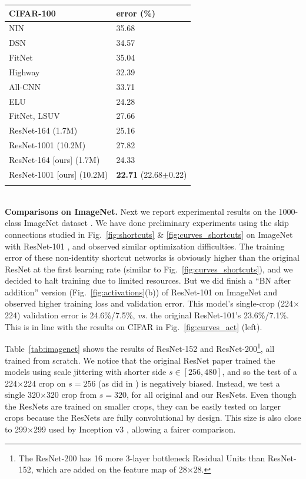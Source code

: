 \documentclass[runningheads]{llncs}
\def\vs{\emph{vs. }}
\begin{document}
\begin{table}[t]
{\fontsize{8pt}{1em}\selectfont
\begin{tabular}{l|l}
\hline
  \textbf{CIFAR-100}   & error (\%) \\
\hline
NIN \cite{Lin2014a} & 35.68 \\ %
DSN \cite{Lee2015} & 34.57 \\ %
FitNet \cite{Romero2015} & 35.04 \\ %
Highway \cite{Srivastava2015a} & 32.39 \\ %
All-CNN \cite{Springenberg2014} & 33.71 \\ %
ELU \cite{Clevert2016} & 24.28 \\ %
FitNet, LSUV \cite{Mishkin2016} & 27.66 \\ %
\hline
ResNet-164 \cite{He2016} (1.7M) & 25.16 \\
ResNet-1001 \cite{He2016} (10.2M) & 27.82 \\
\hline
ResNet-164 [ours] (1.7M) & 24.33 \\
ResNet-1001 [ours] (10.2M) & \textbf{22.71} {\tiny (22.68$\pm$0.22)} \\
\hline
\multicolumn{2}{c}{} \\
\end{tabular}
}
\end{table}

{\small ~\\}
\noindent\textbf{Comparisons on ImageNet.}
Next we report experimental results on the 1000-class ImageNet dataset \cite{Russakovsky2015}. We have done preliminary experiments using the skip connections studied in Fig.~\ref{fig:shortcuts} \& \ref{fig:curves_shortcuts}  on ImageNet with ResNet-101 \cite{He2016}, and observed similar optimization difficulties. The training error of these non-identity shortcut networks is obviously higher than the original ResNet at the first learning rate (similar to Fig.~\ref{fig:curves_shortcuts}), and we decided to halt training due to limited resources. But we did finish a ``BN after addition'' version (Fig.~\ref{fig:activations}(b)) of ResNet-101 on ImageNet and observed higher training loss and validation error. This model's single-crop (224$\times$224) validation error is 24.6\%/7.5\%, \vs the original ResNet-101's 23.6\%/7.1\%. This is in line with the results on CIFAR in Fig.~\ref{fig:curves_act} (left).

Table~\ref{tab:imagenet} shows the results of ResNet-152 \cite{He2016} and ResNet-200\footnote{The ResNet-200 has 16 more 3-layer bottleneck Residual Units than ResNet-152, which are added on the feature map of 28$\times$28.}, all trained from scratch. We notice that the original ResNet paper \cite{He2016} trained the models using scale jittering with shorter side $s\in[256, 480]$, and so the test of a 224$\times$224 crop on $s=256$ (as did in \cite{He2016}) is negatively biased. Instead, we test a single 320$\times$320 crop from $s=320$, for all original and our ResNets.
Even though the ResNets are trained on smaller crops, they can be easily tested on larger crops because the ResNets are fully convolutional by design. This size is also close to 299$\times$299 used by Inception v3 \cite{Szegedy2016a}, allowing a fairer comparison.
\end{document}
